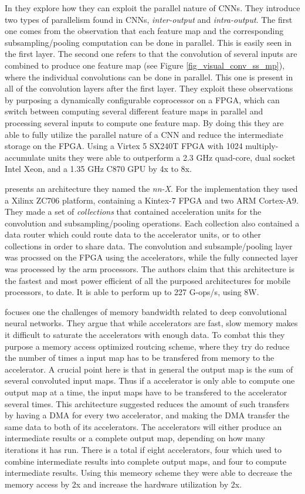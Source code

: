 In \cite{Chakradhar2010} they explore how they can exploit  the parallel nature of CNNs. They introduce two types of parallelism found in CNNs, \textit{inter-output} and \textit{intra-output}. The first one comes from the observation that each feature map and the corresponding subsampling/pooling computation can be done in parallel. This is easily seen in the first layer. The second one refers to that the convolution of several inputs are combined to produce one feature map (see Figure \ref{fig_visual_conv_ss_mp}), where the individual convolutions can be done in parallel. This one is present in all of the convolution layers after the first layer. They exploit these observations by purposing a dynamically configurable coprocessor on a FPGA, which can switch between computing several different feature maps in parallel and processing several inputs to compute one feature map. By doing this they are able to fully utilize the parallel nature of a CNN and reduce the intermediate storage on the FPGA. Using a Virtex 5 SX240T FPGA with 1024 multiply-accumulate units they were able to outperform  a 2.3 GHz quad-core, dual socket Intel Xeon, and a 1.35 GHz C870 GPU by 4x to 8x. 

\cite{Paper} presents an architecture they named the \textit{nn-X}. For the implementation they used a Xilinx ZC706 platform, containing a Kintex-7 FPGA and two ARM Cortex-A9. They made a set of \textit{collections} that contained acceleration units for the convolution and subsampling/pooling operations. Each collection also contained a data router which could route data to the accelerator units, or to other collections in order to share data. The convolution and subsample/pooling layer was procssed on the FPGA using the accelerators, while the fully connected layer was processed by the arm processors. The authors claim that this architecture is the fastest and most power efficient of all the purposed architectures for mobile processors, to date. It is able to perform up to 227 G-ops/s, using 8W.  

\cite{INSERT_PAPER} focuses one the challenges of memory bandwidth related to deep convolutional neural networks. They argue that while accelerators are fast, slow memory makes it difficult to saturate the accelerators with enough data. To combat this they purpose a memory access optimized routcing scheme, where they try do reduce the number of times a input map has to be transfered from memory to the accelerator. A crucial point here is that in general the output map is the sum of several convoluted input maps. Thus if a accelerator is only able to compute one output map at a time, the input maps have to be transfered to the accelerator several times. This architecture suggested reduces the amount of such transfers by having a DMA for every two accelerator, and making the DMA transfer the same data to both of its accelerators. The accelerators will either produce an intermediate results or a complete output map, depending on how many iterations it has run. There is a total if eight accelerators, four which used to combine intermediate results into complete output maps, and four to compute intermediate results. Using this memeory scheme they were able to decrease the memory access by 2x and increase the hardware utilization by 2x. 

